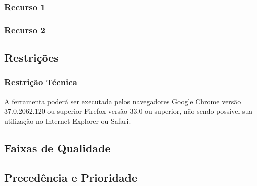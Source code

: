 
\subsubsection{Recurso 1}

\subsubsection{Recurso 2}

\subsection{Restrições}
\subsubsection{Restrição Técnica}

A ferramenta poderá ser executada pelos navegadores Google Chrome versão 37.0.2062.120 ou superior Firefox versão 33.0 ou superior, não sendo possível sua utilização no Internet Explorer ou Safari.


\subsection{Faixas de Qualidade}


\subsection{Precedência e Prioridade}

